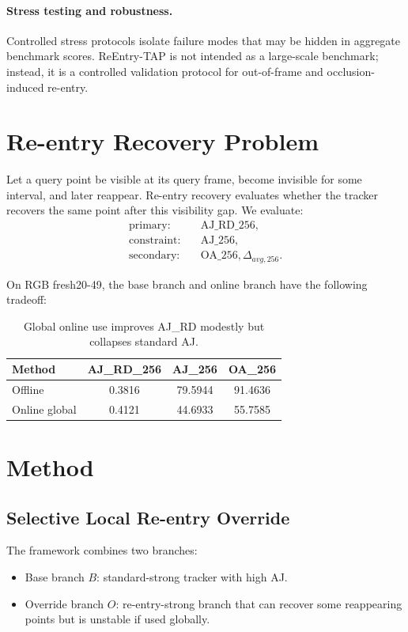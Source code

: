 \documentclass[10pt,twocolumn]{article}
\begin{document}
\paragraph{Stress testing and robustness.}
Controlled stress protocols isolate failure modes that may be hidden in aggregate benchmark scores. ReEntry-TAP is not intended as a large-scale benchmark; instead, it is a controlled validation protocol for out-of-frame and occlusion-induced re-entry.

\section{Re-entry Recovery Problem}

Let a query point be visible at its query frame, become invisible for some interval, and later reappear. Re-entry recovery evaluates whether the tracker recovers the same point after this visibility gap. We evaluate:
\begin{align}
\text{primary:} \quad & \mathrm{AJ\_RD\_256}, \\
\text{constraint:} \quad & \mathrm{AJ\_256}, \\
\text{secondary:} \quad & \mathrm{OA\_256}, \Delta_{avg,256}.
\end{align}

On RGB fresh20-49, the base branch and online branch have the following tradeoff:

\begin{table}[h]
\centering
\small
\begin{tabular}{lccc}
\toprule
Method & AJ\_RD\_256 & AJ\_256 & OA\_256 \\
\midrule
Offline & 0.3816 & 79.5944 & 91.4636 \\
Online global & 0.4121 & 44.6933 & 55.7585 \\
\bottomrule
\end{tabular}
\caption{Global online use improves AJ\_RD modestly but collapses standard AJ.}
\end{table}

\section{Method}

\subsection{Selective Local Re-entry Override}

The framework combines two branches:
\begin{itemize}
    \item Base branch $B$: standard-strong tracker with high AJ.
    \item Override branch $O$: re-entry-strong branch that can recover some reappearing points but is unstable if used globally.
\end{itemize}
\end{document}
